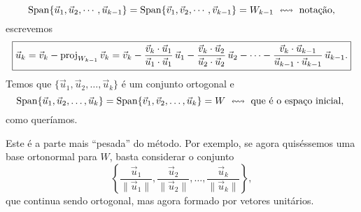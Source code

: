 \documentclass[../livro.tex]{subfiles}  %
\begin{document}
\begin{equation}
\operatorname{Span} \{ \vec{u}_1, \vec{u}_2, \cdots, \vec{u}_{k-1} \} = \operatorname{Span} \{ \vec{v}_1, \vec{v}_2, \cdots, \vec{v}_{k-1} \} = W_{k-1} \ \leftrightsquigarrow \text{ notação,}
\end{equation} escrevemos
\begin{equation}
\boxed{\vec{u}_k = \vec{v}_k - \operatorname{proj}_{W_{k-1}} \vec{v}_k = \vec{v}_k - \frac{\vec{v}_k \cdot \vec{u}_1}{\vec{u}_1 \cdot \vec{u}_1} \, \vec{u}_1 - \frac{\vec{v}_k \cdot \vec{u}_2}{\vec{u}_2 \cdot \vec{u}_2} \, \vec{u}_2 - \cdots - \frac{\vec{v}_k \cdot \vec{u}_{k-1}}{\vec{u}_{k-1} \cdot \vec{u}_{k-1}} \, \vec{u}_{k-1}.}
\end{equation} Temos que $\{\vec{u}_1, \vec{u}_2, \dots, \vec{u}_k\}$ é um conjunto ortogonal e
\begin{equation}
\operatorname{Span} \{ \vec{u}_1, \vec{u}_2, \dots, \vec{u}_k \} = \operatorname{Span} \{ \vec{v}_1, \vec{v}_2, \dots, \vec{u}_k \} = W \ \leftrightsquigarrow \text{ que é o espaço inicial, }
\end{equation} como queríamos.

Este é a parte mais ``pesada'' do método. Por exemplo, se agora quiséssemos uma base ortonormal para $W$, basta considerar o conjunto
\begin{equation}
\left\{ \frac{\vec{u}_1}{\|\vec{u}_1\|}, \frac{\vec{u}_2}{\|\vec{u}_2\|}, \dots, \frac{\vec{u}_k}{\|\vec{u}_k\|} \right\},
\end{equation} que continua sendo ortogonal, mas agora formado por vetores unitários.
\end{document}
